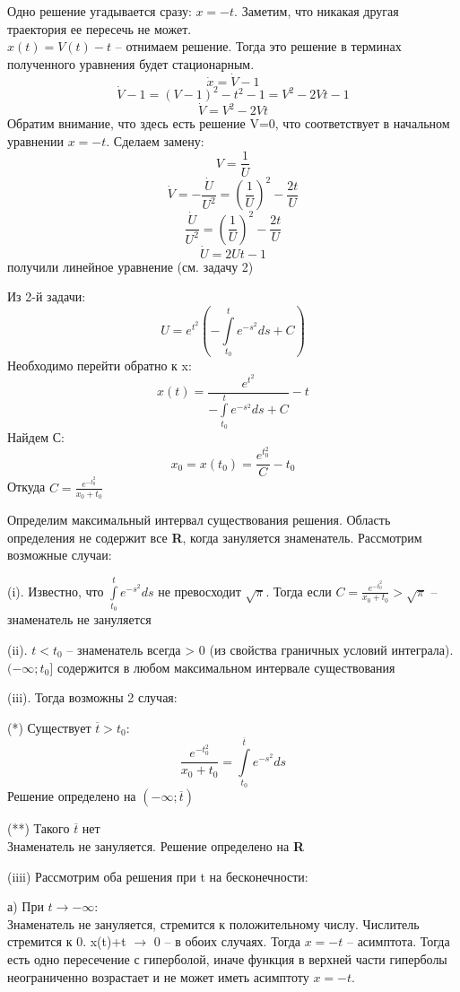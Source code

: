 \documentclass[10pt]{report}
\begin{document}
Одно решение угадывается сразу: $x = -t$. Заметим, что никакая другая траектория ее пересечь не может.\\
$x(t) = V(t) - t$ -- отнимаем решение. Тогда это решение в терминах полученного уравнения будет стационарным.\\
\[
\dot{x} = \dot{V} - 1
\]
\[ \dot{V} - 1= (V-1)^2 - t^2-1 = V^2 - 2Vt -1 
\]
\[
\dot{V} = V^2 -2Vt\]
Обратим внимание, что здесь есть решение V=0, что соответствует в начальном уравнении $x = -t$. Сделаем замену:
\[
V = \frac 1 U\]
\[
\dot{V} = - \frac {\dot{U}} {U^2} = \left(\frac 1 U\right)^2 - \frac {2t} U\]
\[
\frac {\dot{U}} {U^2} =  \left(\frac 1 U\right)^2 - \frac {2t} U\]
\[
\dot{U}= 2Ut - 1\]  получили линейное уравнение (см. задачу 2)

Из 2-й задачи:\[
U =  e^{t^2}\left(- \int\limits_{t_0}^t  e^{-s^2} ds + C \right) \]
Необходимо перейти обратно к x:
\[
x(t) = \frac {e^{t^2}} {- \int\limits_{t_0}^t e^{-s^2} ds + C} - t\]
Найдем С:
\[
x_0 = x(t_0) = \frac {e^{t_0^2}} {C} - t_0\]
Откуда $ C =  \frac {e^{-t_0^2}} {x_0+t_0} $

Определим максимальный интервал существования решения. Область определения не содержит все \textbf{R}, когда зануляется знаменатель. Рассмотрим возможные случаи:

(i). Известно, что  $\int\limits_{t_0}^t e^{-s^2} ds$ не превосходит $\sqrt{\pi}$. Тогда если  $ C =  \frac {e^{-t_0^2}} {x_0+t_0}  > \sqrt{\pi}$ -- знаменатель не зануляется

(ii). $t< t_0 $ -- знаменатель всегда > 0 (из свойства граничных условий интеграла).
$ (-\infty; t_0] $ содержится в любом максимальном интервале существования

(iii). Тогда возможны 2 случая:

(*) Существует $\overline t>t_0$:
\[
\frac {e^{-t_0^2}}{x_0+t_0}=  \int\limits_{t_0}^{\overline{t}}  e^{-s^2} ds\]
Решение определено на $(-\infty; \overline t)$

(**) Такого $\overline t $ нет\\
Знаменатель не зануляется. Решение определено на \textbf{R}

(iiii) Рассмотрим оба решения при t на бесконечности:

а) При $t \rightarrow -\infty$:\\
Знаменатель не зануляется, стремится к положительному числу. Числитель стремится к 0.
x(t)+t $\rightarrow$ 0 -- в обоих случаях. Тогда $x = -t$ -- асимптота. Тогда есть одно пересечение с гиперболой, иначе функция в верхней части гиперболы неограниченно возрастает и не может иметь асимптоту $x = -t$.
\end{document}
